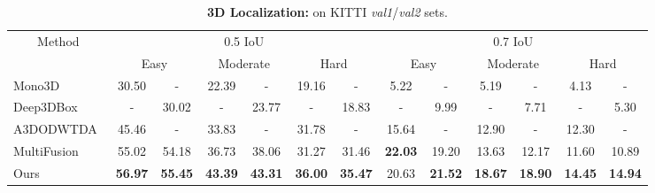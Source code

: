 \documentclass[10pt,twocolumn,letterpaper]{article}
\begin{document}
	\begin{table*}[t!]
		\small
		\centering
		\begin{tabular}{|l||c@{~/~}cc@{~/~}cc@{~/~}c||c@{~/~}cc@{~/~}cc@{~/~}c|}
			\hline
			\multicolumn{1}{|c||}{Method} & \multicolumn{6}{c||}{0.5 IoU} & \multicolumn{6}{c|}{0.7 IoU} \\
			\cline{2-13} &
			\multicolumn{2}{c}{Easy} & \multicolumn{2}{c}{Moderate} & \multicolumn{2}{c||}{Hard} &
			\multicolumn{2}{c}{Easy} & \multicolumn{2}{c}{Moderate} & \multicolumn{2}{c|}{Hard} \\ \hline
			Mono3D~\cite{chen_mono3d}   & 30.50 &   -   & 22.39 &   -   & 19.16 &   -   &  5.22 &   -   &  5.19 &   -   &  4.13 &   -   \\
			Deep3DBox~\cite{mousavian_deep3dbox}  &   -   & 30.02 &   -   & 23.77 &   -   & 18.83 &   -   &  9.99 &   -   &  7.71 &   -   &  5.30 \\ 
			A3DODWTDA~\cite{lindernoren}        & 45.46 &   -   & 33.83 &   -   & 31.78 &   -   & 15.64 &   -   & 12.90 &   -   & 12.30 &   -   \\
			MultiFusion~\cite{xu_multifusion} & 55.02 & 54.18 & 36.73 & 38.06 & 31.27 & 31.46 & \textbf{22.03} & 19.20 & 13.63 & 12.17 & 11.60 & 10.89 \\
			\hline
			Ours        & \textbf{56.97} & \textbf{55.45} & \textbf{43.39} & \textbf{43.31} & \textbf{36.00} & \textbf{35.47} &
			20.63  & \textbf{21.52} & \textbf{18.67} & \textbf{18.90} & \textbf{14.45} & \textbf{14.94} \\
			\hline
		\end{tabular}
		\caption{\textbf{3D Localization:} \emph{} on KITTI \emph{val1}/\emph{val2} sets.}
		\label{tab:kitti_val_bev}
	\end{table*}
	
\end{document}
